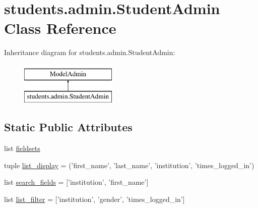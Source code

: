 \hypertarget{classstudents_1_1admin_1_1_student_admin}{\section{students.\-admin.\-Student\-Admin Class Reference}
\label{classstudents_1_1admin_1_1_student_admin}
}
Inheritance diagram for students.\-admin.\-Student\-Admin\-:\begin{figure}[H]
\begin{center}
\leavevmode
\includegraphics[height=2.000000cm]{classstudents_1_1admin_1_1_student_admin}
\end{center}
\end{figure}
\subsection*{Static Public Attributes}
\begin{DoxyCompactItemize}
\item 
list \hyperlink{classstudents_1_1admin_1_1_student_admin_afbc84f07097db4554415109336880a72}{fieldsets}
\item 
tuple \hyperlink{classstudents_1_1admin_1_1_student_admin_a9d2c7c62d35bba277480bb9333c68ff1}{list\-\_\-display} = ('first\-\_\-name', 'last\-\_\-name', 'institution', 'times\-\_\-logged\-\_\-in')
\item 
list \hyperlink{classstudents_1_1admin_1_1_student_admin_a663d7aee6e08010d1280119d480401a8}{search\-\_\-fields} = \mbox{[}'institution', 'first\-\_\-name'\mbox{]}
\item 
list \hyperlink{classstudents_1_1admin_1_1_student_admin_aa123d7d55ffee26570bf64f62f597a14}{list\-\_\-filter} = \mbox{[}'institution', 'gender', 'times\-\_\-logged\-\_\-in'\mbox{]}
\end{DoxyCompactItemize}


